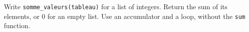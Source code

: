 Write \texttt{somme\_valeurs(tableau)} for a list of integers. Return the sum of its elements, or $0$ for an empty list. Use an accumulator and a loop, without the \texttt{sum} function.
